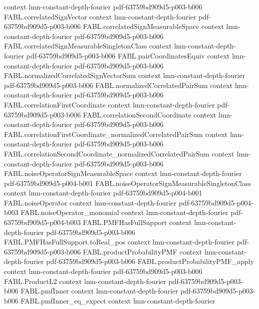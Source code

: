 \begin{theorem}
  {context}
  {lmn-constant-depth-fourier}
  {pdf-63759bd909d5-p003-b006}
\proofstep
  {FABL.correlatedSignVector}
  {context}
  {lmn-constant-depth-fourier}
  {pdf-63759bd909d5-p003-b006}
\proofstep
  {FABL.correlatedSignMeasurableSpace}
  {context}
  {lmn-constant-depth-fourier}
  {pdf-63759bd909d5-p003-b006}
\proofstep
  {FABL.correlatedSignMeasurableSingletonClass}
  {context}
  {lmn-constant-depth-fourier}
  {pdf-63759bd909d5-p003-b006}
\proofstep
  {FABL.pairCoordinatesEquiv}
  {context}
  {lmn-constant-depth-fourier}
  {pdf-63759bd909d5-p003-b006}
\proofstep
  {FABL.normalizedCorrelatedSignVectorSum}
  {context}
  {lmn-constant-depth-fourier}
  {pdf-63759bd909d5-p003-b006}
\proofstep
  {FABL.normalizedCorrelatedPairSum}
  {context}
  {lmn-constant-depth-fourier}
  {pdf-63759bd909d5-p003-b006}
\proofstep
  {FABL.correlationFirstCoordinate}
  {context}
  {lmn-constant-depth-fourier}
  {pdf-63759bd909d5-p003-b006}
\proofstep
  {FABL.correlationSecondCoordinate}
  {context}
  {lmn-constant-depth-fourier}
  {pdf-63759bd909d5-p003-b006}
\proofstep
  {FABL.correlationFirstCoordinate_normalizedCorrelatedPairSum}
  {context}
  {lmn-constant-depth-fourier}
  {pdf-63759bd909d5-p003-b006}
\proofstep
  {FABL.correlationSecondCoordinate_normalizedCorrelatedPairSum}
  {context}
  {lmn-constant-depth-fourier}
  {pdf-63759bd909d5-p003-b006}
\proofstep
  {FABL.noiseOperatorSignMeasurableSpace}
  {context}
  {lmn-constant-depth-fourier}
  {pdf-63759bd909d5-p004-b001}
\proofstep
  {FABL.noiseOperatorSignMeasurableSingletonClass}
  {context}
  {lmn-constant-depth-fourier}
  {pdf-63759bd909d5-p004-b001}
\proofstep
  {FABL.noiseOperator}
  {context}
  {lmn-constant-depth-fourier}
  {pdf-63759bd909d5-p004-b003}
\proofstep
  {FABL.noiseOperator_monomial}
  {context}
  {lmn-constant-depth-fourier}
  {pdf-63759bd909d5-p004-b003}
\proofstep
  {FABL.PMFHasFullSupport}
  {context}
  {lmn-constant-depth-fourier}
  {pdf-63759bd909d5-p003-b006}
\proofstep
  {FABL.PMFHasFullSupport.toReal_pos}
  {context}
  {lmn-constant-depth-fourier}
  {pdf-63759bd909d5-p003-b006}
\proofstep
  {FABL.productProbabilityPMF}
  {context}
  {lmn-constant-depth-fourier}
  {pdf-63759bd909d5-p003-b006}
\proofstep
  {FABL.productProbabilityPMF_apply}
  {context}
  {lmn-constant-depth-fourier}
  {pdf-63759bd909d5-p003-b006}
\proofstep
  {FABL.ProductL2}
  {context}
  {lmn-constant-depth-fourier}
  {pdf-63759bd909d5-p003-b006}
\proofstep
  {FABL.pmfInner}
  {context}
  {lmn-constant-depth-fourier}
  {pdf-63759bd909d5-p003-b006}
\proofstep
  {FABL.pmfInner_eq_expect}
  {context}
  {lmn-constant-depth-fourier}

\end{theorem}
